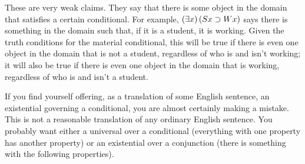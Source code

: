 These are very weak claims. They say that there is some object in the domain that satisfies a certain conditional. For example, $(\exists x) \, (Sx \supset Wx)$ says there is something in the domain such that, if it is a student, it is working. Given the truth conditions for the material conditional, this will be true if there is even one object in the domain that is not a student, regardless of who is and isn't working; it will also be true if there is even one object in the domain that is working, regardless of who is and isn't a student.

If you find yourself offering, as a translation of some English sentence, an existential governing a conditional, you are almost certainly making a mistake. This is not a reasonable translation of any ordinary English sentence. You probably want either a universal over a conditional (everything with one property has another property) or an existential over a conjunction (there is something with the following properties). 




\iffalse



\practiceproblems

